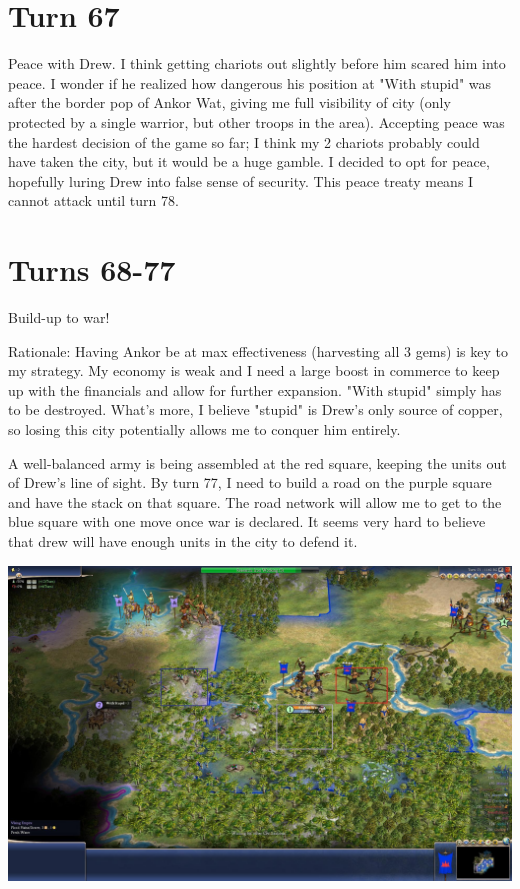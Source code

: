 \documentclass[10pt]{article}
\begin{document}
\section*{Turn 67}

Peace with Drew. I think getting chariots out slightly before him
scared him into peace. I wonder if he realized how dangerous his
position at "With stupid" was after the border pop of Ankor Wat,
giving me full visibility of city (only protected by a single warrior,
but other troops in the area). Accepting peace was the hardest
decision of the game so far; I think my 2 chariots probably could have
taken the city, but it would be a huge gamble. I decided to opt for
peace, hopefully luring Drew into false sense of security. This peace
treaty means I cannot attack until turn 78.

\section*{Turns 68-77}

Build-up to war!

Rationale: Having Ankor be at max effectiveness (harvesting all 3
gems) is key to my strategy. My economy is weak and I need a large
boost in commerce to keep up with the financials and allow for further
expansion. "With stupid" simply has to be destroyed. What's more, I
believe "stupid" is Drew's only source of copper, so losing this city
potentially allows me to conquer him entirely.

A well-balanced army is being assembled at the red square, keeping the
units out of Drew's line of sight. By turn 77, I need to build a road
on the purple square and have the stack on that square. The road
network will allow me to get to the blue square with one move once war
is declared. It seems very hard to believe that drew will have enough
units in the city to defend it.

\includegraphics[width=1.0\textwidth]{turn71}
\end{document}
